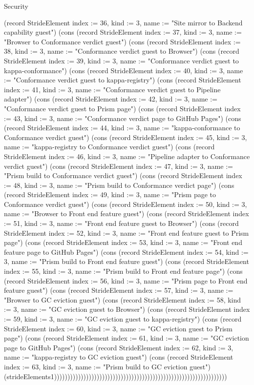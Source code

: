 \begin{lexlean}{Security}
\begin{semanticmodule}
{(record StrideElement {index := 36, kind := 3, name := "Site mirror to Backend capability guest"}) (cons (record StrideElement {index := 37, kind := 3, name := "Browser to Conformance verdict guest"}) (cons (record StrideElement {index := 38, kind := 3, name := "Conformance verdict guest to Browser"}) (cons (record StrideElement {index := 39, kind := 3, name := "Conformance verdict guest to kappa-conformance"}) (cons (record StrideElement {index := 40, kind := 3, name := "Conformance verdict guest to kappa-registry"}) (cons (record StrideElement {index := 41, kind := 3, name := "Conformance verdict guest to Pipeline adapter"}) (cons (record StrideElement {index := 42, kind := 3, name := "Conformance verdict guest to Prism page"}) (cons (record StrideElement {index := 43, kind := 3, name := "Conformance verdict page to GitHub Pages"}) (cons (record StrideElement {index := 44, kind := 3, name := "kappa-conformance to Conformance verdict guest"}) (cons (record StrideElement {index := 45, kind := 3, name := "kappa-registry to Conformance verdict guest"}) (cons (record StrideElement {index := 46, kind := 3, name := "Pipeline adapter to Conformance verdict guest"}) (cons (record StrideElement {index := 47, kind := 3, name := "Prism build to Conformance verdict guest"}) (cons (record StrideElement {index := 48, kind := 3, name := "Prism build to Conformance verdict page"}) (cons (record StrideElement {index := 49, kind := 3, name := "Prism page to Conformance verdict guest"}) (cons (record StrideElement {index := 50, kind := 3, name := "Browser to Front end feature guest"}) (cons (record StrideElement {index := 51, kind := 3, name := "Front end feature guest to Browser"}) (cons (record StrideElement {index := 52, kind := 3, name := "Front end feature guest to Prism page"}) (cons (record StrideElement {index := 53, kind := 3, name := "Front end feature page to GitHub Pages"}) (cons (record StrideElement {index := 54, kind := 3, name := "Prism build to Front end feature guest"}) (cons (record StrideElement {index := 55, kind := 3, name := "Prism build to Front end feature page"}) (cons (record StrideElement {index := 56, kind := 3, name := "Prism page to Front end feature guest"}) (cons (record StrideElement {index := 57, kind := 3, name := "Browser to GC eviction guest"}) (cons (record StrideElement {index := 58, kind := 3, name := "GC eviction guest to Browser"}) (cons (record StrideElement {index := 59, kind := 3, name := "GC eviction guest to kappa-registry"}) (cons (record StrideElement {index := 60, kind := 3, name := "GC eviction guest to Prism page"}) (cons (record StrideElement {index := 61, kind := 3, name := "GC eviction page to GitHub Pages"}) (cons (record StrideElement {index := 62, kind := 3, name := "kappa-registry to GC eviction guest"}) (cons (record StrideElement {index := 63, kind := 3, name := "Prism build to GC eviction guest"}) (strideElements1)))))))))))))))))))))))))))))))))))))))))))))))))))))))))))))))))
}


\end{semanticmodule}
\end{lexlean}
